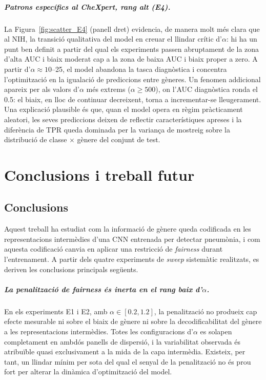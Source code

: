 \documentclass[a4paper,12pt,twoside]{ThesisStyle}
\begin{document}
\paragraph{Patrons específics al CheXpert, rang alt (E4).}
La Figura~\ref{fig:scatter_E4} (panell dret) evidencia, de manera molt més clara que al NIH, la transició qualitativa del model en creuar el llindar crític d'$\alpha$: hi ha un punt ben definit a partir del qual els experiments passen abruptament de la zona d'alta AUC i biaix moderat cap a la zona de baixa AUC i biaix proper a zero. A partir d'$\alpha \approx 10$--25, el model abandona la tasca diagnòstica i concentra l'optimització en la igualació de prediccions entre gèneres. Un fenomen addicional apareix per als valors d'$\alpha$ més extrems ($\alpha \geq 500$), on l'AUC diagnòstica ronda el 0.5: el biaix, en lloc de continuar decreixent, torna a incrementar-se lleugerament. Una explicació plausible és que, quan el model opera en règim pràcticament aleatori, les seves prediccions deixen de reflectir característiques apreses i la diferència de TPR queda dominada per la variança de mostreig sobre la distribució de classe $\times$ gènere del conjunt de test.


\chapter{Conclusions i treball futur}
\label{cap:concl}

\section{Conclusions}

Aquest treball ha estudiat com la informació de gènere queda codificada en les representacions intermèdies d'una CNN entrenada per detectar pneumònia, i com aquesta codificació canvia en aplicar una restricció de \textit{fairness} durant l'entrenament. A partir dels quatre experiments de \textit{sweep} sistemàtic realitzats, es deriven les conclusions principals següents.

\paragraph{La penalització de \textit{fairness} és inerta en el rang baix d'$\alpha$.}
En els experiments E1 i E2, amb $\alpha \in [0.2, 1.2]$, la penalització no produeix cap efecte mesurable ni sobre el biaix de gènere ni sobre la decodificabilitat del gènere a les representacions intermèdies. Totes les configuracions d'$\alpha$ es solapen completament en ambdós panells de dispersió, i la variabilitat observada és atribuïble quasi exclusivament a la mida de la capa intermèdia. Existeix, per tant, un llindar mínim per sota del qual el senyal de la penalització no és prou fort per alterar la dinàmica d'optimització del model.
\end{document}
